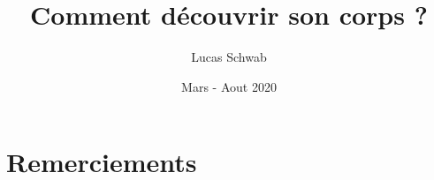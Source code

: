 \documentclass[11pt,french]{article}
\title{Comment découvrir son corps ?}
\author{Lucas Schwab}
\date{Mars - Aout 2020}
\begin{document}
\maketitle








\tableofcontents

\section{Remerciements}

\end{document}
